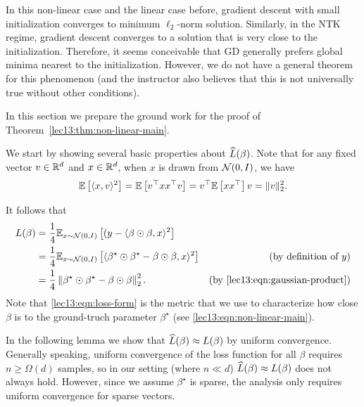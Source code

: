 \begin{remark}    
In this non-linear case and the linear case before, gradient descent with small initialization converges to minimum $\ell_2$-norm solution. Similarly, in the NTK regime, gradient descent converges to a solution that is very close to the initialization. Therefore, it seems conceivable that GD generally prefers global minima nearest to the initialization. However, we do not have a general theorem for this phenomenon (and the instructor also believes that this is not universally true without other conditions). 
\end{remark}

\label{lec13:sec:rip}

In this section we prepare the ground work for the proof of Theorem~\ref{lec13:thm:non-linear-main}.

We start by showing several basic properties about $\widehat{L}(\beta)$. Note that for any fixed vector $v\in\mathbb R^{d}$ and $x\in \mathbb R^{d}$, when $x$ is drawn from $\mathcal N(0,I)$, we have
\begin{equation}\label{lec13:eqn:gaussian-product}
    \mathbb{E} \left[\langle x, v\rangle^2 \right]=\mathbb{E} \left[ v^\top xx^\top v \right]=v^\top\mathbb{E} \left[ xx^\top \right]v=\|v\|_2^2.
\end{equation}

It follows that 
\begin{align}
    L(\beta)&=\frac{1}{4}\mathbb{E}_{x\sim \mathcal N(0,I)} \left[(y-\langle \beta\odot\beta,x\rangle^2 \right] \\
    &=\frac{1}{4}\mathbb{E}_{x\sim \mathcal N(0,I)} \left[\langle \beta^\star\odot\beta^\star-\beta\odot\beta,x\rangle^2 \right] &\text{(by definition of $y$)} \\
    &=\frac{1}{4} \left\| \beta^\star\odot\beta^\star-\beta\odot\beta \right\|_2^2.\label{lec13:eqn:loss-form} &\text{(by \eqref{lec13:eqn:gaussian-product})}
\end{align}
Note that \eqref{lec13:eqn:loss-form} is the metric that we use to characterize how close $\beta$ is to the ground-truch parameter $\beta^\star$ (see \eqref{lec13:eqn:non-linear-main}).

In the following lemma we show that $\widehat{L}(\beta) \approx L(\beta)$ by uniform convergence. Generally speaking, uniform convergence of the loss function for all $\beta$ requires $n\ge \Omega(d)$ samples, so in our setting (where $n\ll d$) $\widehat{L}(\beta) \approx L(\beta)$ does not always hold. However, since we assume $\beta^\star$ is sparse, the analysis only requires uniform convergence for sparse vectors.

